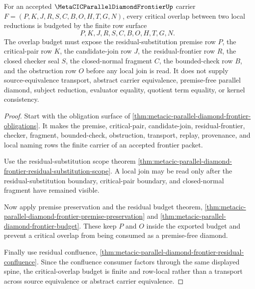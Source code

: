 \begin{theorem}
\label{thm:metacic-parallel-diamond-frontier-critical-overlap-budget}
For an accepted $\MetaCICParallelDiamondFrontierUp$ carrier $F=(P,K,J,R,S,C,B,O,H,T,G,N)$, every critical overlap between two local reductions is budgeted by the finite row surface
$$
P,K,J,R,S,C,B,O,H,T,G,N .
$$
The overlap budget must expose the residual-substitution premise row $P$, the critical-pair row $K$, the candidate-join row $J$, the residual-frontier row $R$, the closed checker seal $S$, the closed-normal fragment $C$, the bounded-check row $B$, and the obstruction row $O$ before any local join is read. It does not supply source-equivalence transport, abstract carrier equivalence, premise-free parallel diamond, subject reduction, evaluator equality, quotient term equality, or kernel consistency.
\end{theorem}
\begin{proof}
Start with the obligation surface of \autoref{thm:metacic-parallel-diamond-frontier-obligations}. It makes the premise, critical-pair, candidate-join, residual-frontier, checker, fragment, bounded-check, obstruction, transport, replay, provenance, and local naming rows the finite carrier of an accepted frontier packet.

Use the residual-substitution scope theorem \autoref{thm:metacic-parallel-diamond-frontier-residual-substitution-scope}. A local join may be read only after the residual-substitution boundary, critical-pair boundary, and closed-normal fragment have remained visible.

Now apply premise preservation and the residual budget theorem, \autoref{thm:metacic-parallel-diamond-frontier-premise-preservation} and \autoref{thm:metacic-parallel-diamond-frontier-budget}. These keep $P$ and $O$ inside the exported budget and prevent a critical overlap from being consumed as a premise-free diamond.

Finally use residual confluence, \autoref{thm:metacic-parallel-diamond-frontier-residual-confluence}. Since the confluence consumer factors through the same displayed spine, the critical-overlap budget is finite and row-local rather than a transport across source equivalence or abstract carrier equivalence.
\end{proof}


